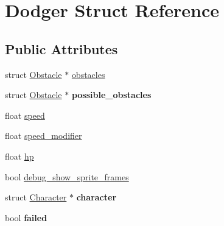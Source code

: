 \hypertarget{structDodger}{\section{Dodger Struct Reference}
\label{structDodger}
}
\subsection*{Public Attributes}
\begin{DoxyCompactItemize}
\item 
struct \hyperlink{structObstacle}{Obstacle} $\ast$ \hyperlink{structDodger_a114a5a2b5b3640ce2bd7b5a9f7486dfc}{obstacles}
\item 
\hypertarget{structDodger_a973973b8048bb784aa7614dd2333da80}{struct \hyperlink{structObstacle}{Obstacle} $\ast$ {\bfseries possible\+\_\+obstacles}}\label{structDodger_a973973b8048bb784aa7614dd2333da80}

\item 
float \hyperlink{structDodger_a1a8788405347cc07d8e3332095deb51b}{speed}
\item 
float \hyperlink{structDodger_a0bcffe9e79d8a419d6943ac33b379a9f}{speed\+\_\+modifier}
\item 
float \hyperlink{structDodger_a2a05383a1e79a65e33f229f38329c628}{hp}
\item 
bool \hyperlink{structDodger_a814b9ffa7fabe1427cc5e28f0f152a53}{debug\+\_\+show\+\_\+sprite\+\_\+frames}
\item 
\hypertarget{structDodger_af612d4c6689512afd255af4d9d9a9aee}{struct \hyperlink{structCharacter}{Character} $\ast$ {\bfseries character}}\label{structDodger_af612d4c6689512afd255af4d9d9a9aee}

\item 
\hypertarget{structDodger_a494d42bd11a7029512ffb303d848e348}{bool {\bfseries failed}}\label{structDodger_a494d42bd11a7029512ffb303d848e348}


\end{DoxyCompactItemize}
